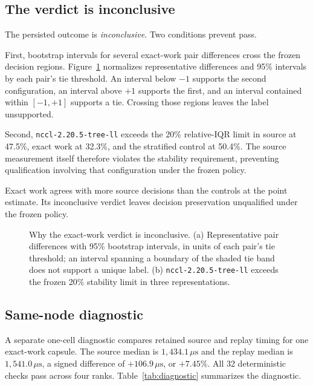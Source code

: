 \documentclass[10pt,twocolumn]{article}
\newcommand{\us}{\,\mu\mathrm{s}}
\begin{document}
\subsection{The verdict is inconclusive}
\label{sec:verdict}

The persisted outcome is \emph{inconclusive}. Two conditions prevent pass.

First, bootstrap intervals for several exact-work pair differences cross the
frozen decision regions. Figure~\ref{fig:inconclusive} normalizes representative
differences and 95\% intervals by each pair's tie threshold. An interval below
$-1$ supports the second configuration, an interval above $+1$ supports the
first, and an interval contained within $[-1,+1]$ supports a tie. Crossing
those regions leaves the label unsupported.

Second, \texttt{nccl-2.20.5-tree-ll} exceeds the 20\% relative-IQR limit in
source at 47.5\%, exact work at 32.3\%, and the stratified control at 50.4\%.
The source measurement itself therefore violates the stability requirement,
preventing qualification involving that configuration under the frozen policy.

Exact work agrees with more source decisions than the controls at the point
estimate. Its inconclusive verdict leaves decision preservation unqualified
under the frozen policy.

\begin{figure}[t]
  \centering
  
  \caption{Why the exact-work verdict is inconclusive. (a) Representative
  pair differences with 95\% bootstrap intervals, in units of each pair's tie
  threshold; an interval spanning a boundary of the shaded tie band does not
  support a unique label. (b) \texttt{nccl-2.20.5-tree-ll} exceeds the frozen
  20\% stability limit in three representations.}
  \label{fig:inconclusive}
\end{figure}

\subsection{Same-node diagnostic}

A separate one-cell diagnostic compares retained source and replay timing for
one exact-work capsule. The source median is $1{,}434.1\us$ and the replay
median is $1{,}541.0\us$, a signed difference of $+106.9\us$, or $+7.45\%$. All 32 deterministic checks pass across four ranks.
Table~\ref{tab:diagnostic} summarizes the diagnostic.
\end{document}
